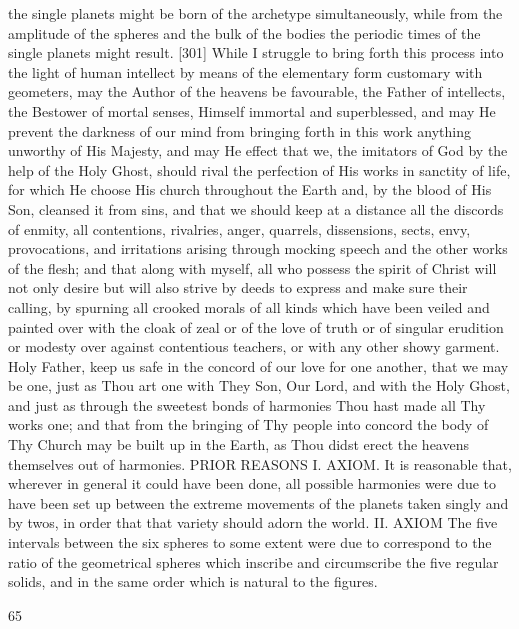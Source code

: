 \documentclass{article}
\begin{document}
the single planets might be born of the archetype simultaneously, while
from the amplitude of the spheres and the bulk of the bodies the periodic
times of the single planets might result.
[301] While I struggle to bring forth this process into the light of human
intellect by means of the elementary form customary with geometers,
may the Author of the heavens be favourable, the Father of intellects, the
Bestower of mortal senses, Himself immortal and superblessed, and may
He prevent the darkness of our mind from bringing forth in this work
anything unworthy of His Majesty, and may He effect that we, the
imitators of God by the help of the Holy Ghost, should rival the
perfection of His works in sanctity of life, for which He choose His
church throughout the Earth and, by the blood of His Son, cleansed it
from sins, and that we should keep at a distance all the discords of
enmity, all contentions, rivalries, anger, quarrels, dissensions, sects,
envy, provocations, and irritations arising through mocking speech and
the other works of the flesh; and that along with myself, all who possess
the spirit of Christ will not only desire but will also strive by deeds to
express and make sure their calling, by spurning all crooked morals of all
kinds which have been veiled and painted over with the cloak of zeal or
of the love of truth or of singular erudition or modesty over against
contentious teachers, or with any other showy garment. Holy Father,
keep us safe in the concord of our love for one another, that we may be
one, just as Thou art one with They Son, Our Lord, and with the Holy
Ghost, and just as through the sweetest bonds of harmonies Thou hast
made all Thy works one; and that from the bringing of Thy people into
concord the body of Thy Church may be built up in the Earth, as Thou
didst erect the heavens themselves out of harmonies.
PRIOR REASONS
I. AXIOM. It is reasonable that, wherever in general it could have been
done, all possible harmonies were due to have been set up between the
extreme movements of the planets taken singly and by twos, in order
that that variety should adorn the world.
II. AXIOM The five intervals between the six spheres to some extent
were due to correspond to the ratio of the geometrical spheres which
inscribe and circumscribe the five regular solids, and in the same order
which is natural to the figures.


65
\end{document}
